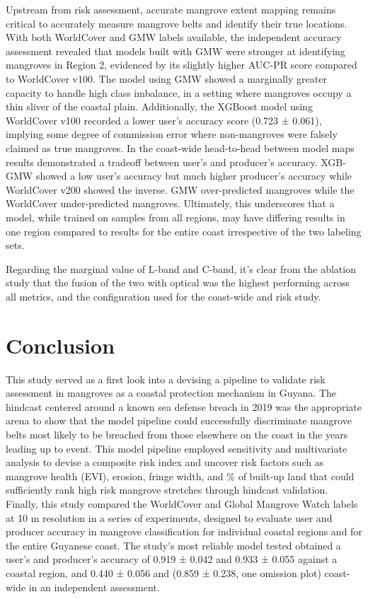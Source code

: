 \documentclass[final-report]{report-template}
\begin{document}
Upstream from risk assessment, accurate mangrove extent mapping remains critical to accurately measure mangrove belts  and identify their true locations. With both WorldCover and GMW  labels available, the independent accuracy assessment revealed that models built with GMW were stronger at identifying mangroves in Region 2, evidenced by its slightly higher AUC-PR score compared to WorldCover v100. The model using GMW showed a marginally greater capacity to handle high class imbalance, in a setting where mangroves occupy a thin sliver of the coastal plain. Additionally, the XGBoost model using WorldCover v100 recorded a lower user's accuracy score (0.723 ± 0.061), implying some degree of commission error where non-mangroves were falsely claimed as true mangroves. In the coast-wide head-to-head between model maps results demonstrated a tradeoff between user's and producer's accuracy. XGB-GMW showed a low user's accuracy but much higher producer's accuracy while WorldCover v200 showed the inverse. GMW over-predicted mangroves while the WorldCover under-predicted mangroves. Ultimately, this underscores that a model, while trained on samples from all regions, may have differing  results in one region compared to results for the entire coast irrespective of the two labeling sets. 

Regarding the marginal value of L-band and C-band, it's clear from the ablation study that the fusion of the two with optical was the highest performing across all metrics, and the configuration used for the coast-wide and risk study. %

\section{Conclusion}
This study served as a first look into a devising a pipeline to validate risk assessment in mangroves as a coastal protection mechanism in Guyana. The hindcast centered around a known sea defense breach in 2019 was the appropriate arena to show that the model pipeline could successfully discriminate mangrove belts most likely to be breached from those elsewhere on the coast in the years leading up to event. This model pipeline employed sensitivity and multivariate analysis to devise a composite risk index and uncover risk factors such as mangrove health (EVI), erosion, fringe width, and \% of built-up land that could sufficiently rank high risk mangrove stretches through hindcast validation. Finally, this study compared the WorldCover and Global Mangrove Watch labels at 10 m resolution in a series of experiments, designed to evaluate user and producer accuracy in mangrove classification for individual coastal regions and for the entire Guyanese coast. The study's most reliable model tested obtained a user's and producer's accuracy of 0.919 ± 0.042 and 0.933 ± 0.055 against a coastal region, and 0.440 ± 0.056 and (0.859 ± 0.238, one omission plot) coast-wide in an independent assessment.
\end{document}
